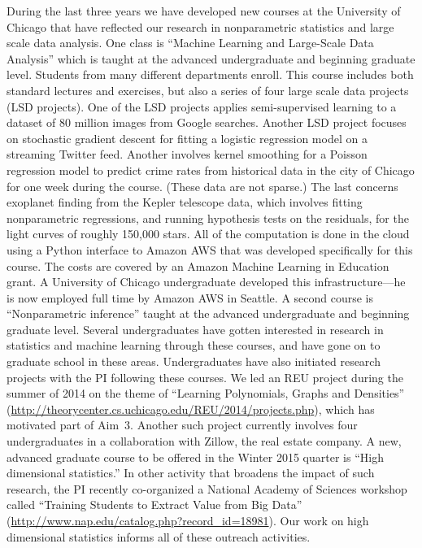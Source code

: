 During the last three years we have developed
new courses at the University of Chicago that have reflected our
research in nonparametric statistics and large scale data analysis.
One class is ``Machine Learning and Large-Scale Data Analysis'' which
is taught at the advanced undergraduate and beginning graduate level.
Students from many different departments enroll.  This course includes
both standard lectures and exercises, but also a series of four large
scale data projects (LSD projects).  One of the LSD projects applies
semi-supervised learning to a dataset of 80 million images from
Google searches.  Another LSD project focuses on stochastic gradient
descent for fitting a logistic regression model on a streaming Twitter
feed.  Another involves kernel smoothing for a Poisson regression
model to predict crime rates from historical data in the city of
Chicago for one week during the course.  (These data are not sparse.)
The last concerns exoplanet finding from the Kepler telescope data,
which involves fitting nonparametric regressions, and running
hypothesis tests on the residuals, for the light curves of roughly
150,000 stars.  All of the computation is done in the cloud using a
Python interface to Amazon AWS that was developed specifically for
this course.  The costs are covered by an Amazon Machine Learning in
Education grant. A University of Chicago undergraduate developed this
infrastructure---he is now employed full time by Amazon AWS in
Seattle.  A second course is ``Nonparametric inference'' taught at the
advanced undergraduate and beginning graduate level.  Several
undergraduates have gotten interested in research in statistics and
machine learning through these courses, and have gone on to graduate
school in these areas.  Undergraduates have also initiated
research projects with the PI following these courses.  
We led an REU project during the summer of 2014 on
the theme of ``Learning Polynomials, Graphs and
Densities'' (\href{http://theorycenter.cs.uchicago.edu/REU/2014/projects.php}
{http://theorycenter.cs.uchicago.edu/REU/2014/projects.php}),
which has motivated part of Aim~3. Another such
project currently involves four undergraduates in a collaboration with
Zillow, the real estate company.  A new, advanced graduate course to
be offered in the Winter 2015 quarter is ``High dimensional
statistics.''  In other activity that broadens the impact of such research, the PI
recently co-organized a National Academy of Sciences workshop
called ``Training Students to Extract Value from Big Data''
(\href{http://www.nap.edu/catalog.php?record_id=18981}{http://www.nap.edu/catalog.php?record\_id=18981}).
Our work on high dimensional statistics informs all of these outreach
activities.

